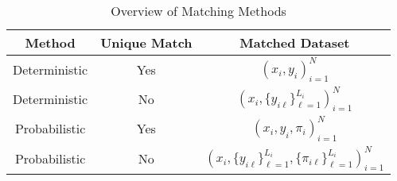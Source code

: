 
\begin{table}[htbp]
\begin{center}
\caption{Overview of Matching Methods}
\vspace{6pt}
\begin{tabular}{ccc}
\toprule
Method         & Unique Match & Matched Dataset                                                                           \\
\midrule
Deterministic  & Yes          & $\left(x_i, y_i\right)_{i=1}^N$                                                           \\
Deterministic    & No           & $\left(x_i, \{y_{i\ell}\}_{\ell=1}^{L_i}\right)_{i=1}^N$                                  \\
Probabilistic     & Yes          & $\left(x_i, y_i, \pi_i \right)_{i=1}^N$                                                   \\
Probabilistic & No           & $\left(x_i, \{y_{i\ell}\}_{\ell=1}^{L_i}, \{\pi_{i\ell}\}_{\ell=1}^{L_i} \right)_{i=1}^N$ \\\bottomrule
\end{tabular}
\label{overview}
\end{center}
\end{table}
